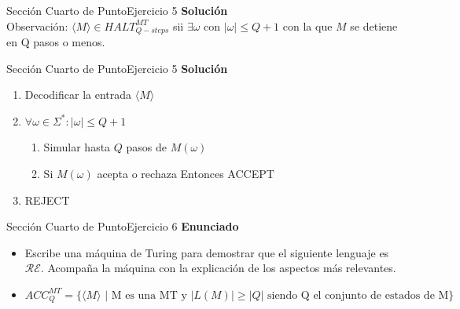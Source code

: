 \documentclass[10pt, envcountsect, presentation, aspectratio=169]{beamer}
\newcommand{\lr}{\ensuremath{\mathcal {RE}}}
\begin{document}

\begin{frame}{Sección Cuarto de Punto}{Ejercicio 5}
    \textbf{Solución}\\
    Observación: $\langle M \rangle \in HALT_{Q-steps}^{MT}$ sii $\exists \omega \text{ con } | \omega | \leq Q+1$ con la que $M$ se detiene en Q pasos o menos.\\
\end{frame}


\begin{frame}{Sección Cuarto de Punto}{Ejercicio 5}
    \textbf{Solución}\\
    \begin{enumerate}
        \item Decodificar la entrada $\langle M \rangle$
        \item $\forall \omega \in \Sigma^* : |\omega| \leq Q+1$
        \begin{enumerate}
            \item Simular hasta $Q$ pasos de $M(\omega)$
            \item Si $M(\omega)$ acepta o rechaza Entonces ACCEPT
        \end{enumerate}
        \item REJECT
    \end{enumerate}
\end{frame}



\begin{frame}{Sección Cuarto de Punto}{Ejercicio 6}
\textbf{Enunciado}
	\begin{itemize}
        \item Escribe una máquina de Turing para demostrar que el siguiente lenguaje es $\lr$. Acompaña la máquina con la explicación de los aspectos más relevantes. 
        \item[] $$ACC_{Q}^{MT}=\{\langle M \rangle \mbox{ | M es una MT y } |L(M)| \geq |Q| \mbox{ siendo Q el conjunto de estados de M}\}$$
    \end{itemize}
\end{frame}
\end{document}
